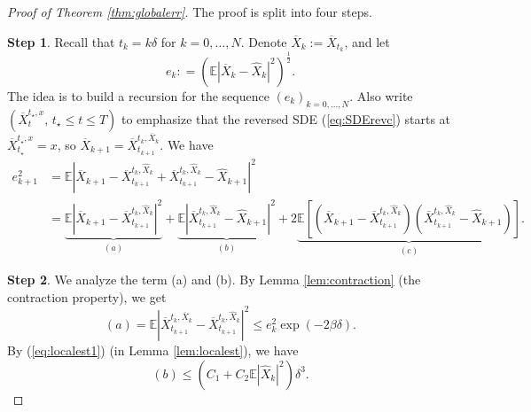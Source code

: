 \documentclass[letterpaper,10pt,reqno]{amsart}
\def\eqref#1{(\ref{#1})}
\numberwithin{equation}{section}
\begin{document}
\begin{proof}[Proof of Theorem \ref{thm:globalerr}]
The proof is split into four steps.

\smallskip
{\bf Step 1}. Recall that $t_k = k \delta$ for $k = 0, \ldots, N$.
Denote $\overline{X}_k:=\overline{X}_{t_k}$,
and let 
\begin{equation*}
e_k: = \left(\mathbb{E}|\overline{X}_k - \widehat{X}_k|^2 \right)^{\frac{1}{2}}.
\end{equation*}
The idea is to build a recursion for the sequence $(e_k)_{k = 0, \ldots, N}$.
Also write $(\overline{X}^{t_\star, x}_t, \, t_\star \le t \le T)$ to emphasize that
the reversed SDE \eqref{eq:SDErevc} starts at $\overline{X}^{t_\star, x}_{t_\star} = x$,
so $\overline{X}_{k+1} = \overline{X}^{t_k, \overline{X}_k}_{t_{k+1}}$.
We have
\begin{equation}
\label{eq:decompabc}
\begin{aligned}
e_{k+1}^2 & = \mathbb{E}\left|\overline{X}_{k+1} - \overline{X}_{t_{k+1}}^{t_k, \widehat{X}_k} +  \overline{X}_{t_{k+1}}^{t_k, \widehat{X}_k}- \widehat{X}_{k+1} \right|^2 \\
& = \underbrace{\mathbb{E}|\overline{X}_{k+1} - \overline{X}_{t_{k+1}}^{t_k, \widehat{X}_k}|^2}_{(a)} + \underbrace{\mathbb{E}|\overline{X}_{t_{k+1}}^{t_k, \widehat{X}_k}- \widehat{X}_{k+1}|^2}_{(b)} + 2 \underbrace{\mathbb{E}\left[ (\overline{X}_{k+1} - \overline{X}_{t_{k+1}}^{t_k, \widehat{X}_k}) (\overline{X}_{t_{k+1}}^{t_k, \widehat{X}_{k}}- \widehat{X}_{k+1})\right]}_{(c)}.
\end{aligned}
\end{equation}

{\bf Step 2}. We analyze the term (a) and (b). 
By Lemma \ref{lem:contraction} (the contraction property), 
we get
\begin{equation}
\label{eq:terma1}
(a) = \mathbb{E}|\overline{X}_{t_{k+1}}^{t_k, \overline{X}_k} - \overline{X}_{t_{k+1}}^{t_k, \widehat{X}_k}|^2 \le e_k^2 \exp(- 2 \beta \delta).
\end{equation}
By \eqref{eq:localest1} (in Lemma \ref{lem:localest}), we have
\begin{equation}
\label{eq:termb1}
(b) \le \left(C_1 + C_2 \mathbb{E}|\widehat{X}_k|^2 \right) \delta^3.
\end{equation}


\end{proof}
\end{document}
